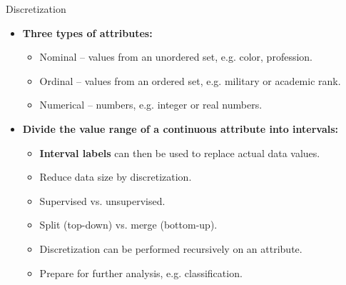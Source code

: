 \documentclass[aspectratio=169,t]{beamer}
\begin{document}
  {
    \begin{frame}{Discretization}
    \begin{itemize}
      \item \textbf{Three types of attributes:}
      \begin{itemize}
        \item Nominal -- values from an unordered set, e.g. color, profession.
        \item Ordinal -- values from an ordered set, e.g. military or academic rank.
        \item Numerical -- numbers, e.g. integer or real numbers.
      \end{itemize}
      \item \textbf{Divide the value range of a continuous attribute into intervals:}
      \begin{itemize}
        \item \textbf{Interval labels} can then be used to replace actual data values.
        \item Reduce data size by discretization.
        \item Supervised vs. unsupervised.
        \item Split (top-down) vs. merge (bottom-up).
        \item Discretization can be performed recursively on an attribute.
        \item Prepare for further analysis, e.g. classification.
      \end{itemize}
    \end{itemize}
    \end{frame}
  }
\end{document}
